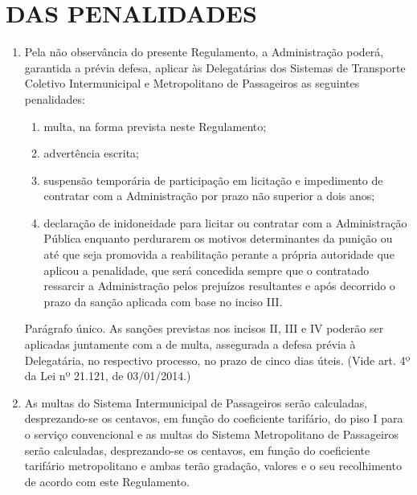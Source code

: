 \chapter{DAS PENALIDADES}

\begin{enumerate}[resume, label=Art. \arabic*]

\item Pela não observância do presente Regulamento, a Administração poderá, garantida a prévia defesa, aplicar às Delegatárias dos Sistemas de Transporte Coletivo Intermunicipal e Metropolitano de Passageiros as seguintes penalidades:

\begin{enumerate}[label=\roman*.]

\item multa, na forma prevista neste Regulamento;

\item advertência escrita;

\item suspensão temporária de participação em licitação e impedimento de contratar com a Administração por prazo não superior a dois anos;

\item declaração de inidoneidade para licitar ou contratar com a Administração Pública enquanto perdurarem os motivos determinantes da punição ou até que seja promovida a reabilitação perante a própria autoridade que aplicou a penalidade, que será concedida sempre que o contratado ressarcir a Administração pelos prejuízos resultantes e após decorrido o prazo da sanção aplicada com base no inciso III.

\end{enumerate}

Parágrafo único. As sanções previstas nos incisos II, III e IV poderão ser aplicadas juntamente com a de multa, assegurada a defesa prévia à Delegatária, no respectivo processo, no prazo de cinco dias úteis. (Vide art. 4º da Lei nº 21.121, de 03/01/2014.)

\item As multas do Sistema Intermunicipal de Passageiros serão calculadas, desprezando-se os centavos, em função do coeficiente tarifário, do piso I para o serviço convencional e as multas do Sistema Metropolitano de Passageiros serão calculadas, desprezando-se os centavos, em função do coeficiente tarifário metropolitano e ambas terão gradação, valores e o seu recolhimento de acordo com este Regulamento.


\end{enumerate}
